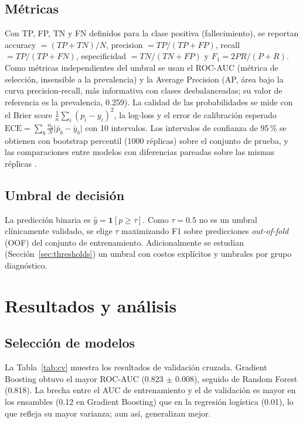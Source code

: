 \documentclass[conference]{IEEEtran}
\begin{document}
\subsection{Métricas}
Con TP, FP, TN y FN definidos para la clase positiva (fallecimiento), se reportan accuracy $=(TP+TN)/N$, precision $=TP/(TP+FP)$, recall $=TP/(TP+FN)$, especificidad $=TN/(TN+FP)$ y $F_1=2PR/(P+R)$. Como métricas independientes del umbral se usan el ROC-AUC (métrica de selección, insensible a la prevalencia) y la Average Precision (AP, área bajo la curva precision-recall, más informativa con clases desbalanceadas; su valor de referencia es la prevalencia, 0.259). La calidad de las probabilidades se mide con el Brier score $\frac1n\sum_i(p_i-y_i)^2$, la log-loss y el error de calibración esperado $\mathrm{ECE}=\sum_b\frac{n_b}{N}\lvert\bar p_b-\bar y_b\rvert$ con 10 intervalos. Los intervalos de confianza de 95\,\% se obtienen con bootstrap percentil (1000 réplicas) sobre el conjunto de prueba, y las comparaciones entre modelos con diferencias pareadas sobre las mismas réplicas \cite{efron1993}.

\subsection{Umbral de decisión}
La predicción binaria es $\hat y=\mathbf 1[p\ge\tau]$. Como $\tau=0.5$ no es un umbral clínicamente validado, se elige $\tau$ maximizando F1 sobre predicciones \textit{out-of-fold} (OOF) del conjunto de entrenamiento. Adicionalmente se estudian (Sección~\ref{sec:thresholds}) un umbral con costos explícitos y umbrales por grupo diagnóstico.

\section{Resultados y análisis}

\subsection{Selección de modelos}
La Tabla~\ref{tab:cv} muestra los resultados de validación cruzada. Gradient Boosting obtuvo el mayor ROC-AUC (0.823 $\pm$ 0.008), seguido de Random Forest (0.818). La brecha entre el AUC de entrenamiento y el de validación es mayor en los ensambles (0.12 en Gradient Boosting) que en la regresión logística (0.01), lo que refleja su mayor varianza; aun así, generalizan mejor.


\end{document}
